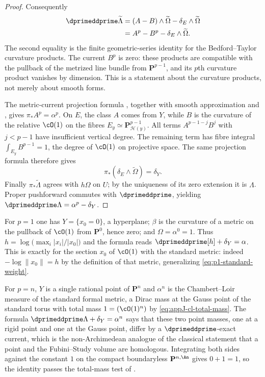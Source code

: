 \begin{proof}
Consequently
\[
 \begin{aligned}
 \dprimeddprime\widetilde\Lambda
  &=(A-B)\wedge\widetilde\Omega
       -\delta_E\wedge\widetilde\Omega\\
  &=A^p-B^p-\delta_E\wedge\widetilde\Omega.
 \end{aligned}
\]
The second equality is the finite geometric-series identity for the
Bedford--Taylor curvature products.  The current $B^p$ is zero: these
products are compatible with the pullback of the metrized line bundle
from $\mathbf P^{p-1}$, and its $p$th curvature product vanishes by
dimension.  This is a statement about the curvature products, not merely
about smooth forms.

The metric-current projection formula
\cite[Theorem~16.5.7]{CLD25}, together with smooth approximation and
, gives
$\pi_*A^p=\alpha^p$.  On $E$, the class $A$ comes from $Y$, while $B$ is the
curvature of the relative $\cO(1)$ on the fibres
$E_y\simeq\mathbf P^{p-1}_{\mathcal H(y)}$.  All terms
$A^{p-1-j}B^j$ with $j<p-1$ have insufficient vertical degree.  The
remaining term has fibre integral
$\int_{E_y}B^{p-1}=1$, the degree of $\cO(1)$ on projective space.
The same projection formula therefore gives
\[
 \pi_*(\delta_E\wedge\widetilde\Omega)=\delta_Y.
\]
Finally $\pi_*\widetilde\Lambda$ agrees with $h\Omega$ on $U$; by the
uniqueness of its zero extension it is $\Lambda$.  Proper pushforward
commutes with $\dprimeddprime$, yielding
$\dprimeddprime\Lambda=\alpha^p-\delta_Y$.
\end{proof}

\begin{example}[$p=1$ recovers Poincar\'e--Lelong again]
\label{ex:ch15-levine-p1}
For $p=1$ one has $Y=\{x_0=0\}$, a hyperplane; $\beta$ is the curvature of a
metric on the pullback of $\cO(1)$ from $\mathbf P^0$, hence zero; and
$\Omega=\alpha^0=1$.  Thus $h=\log\bigl(\max_i|x_i|/|x_0|\bigr)$ and the
formula reads $\dprimeddprime[h]+\delta_Y=\alpha$.  This is exactly
 for the section $x_0$ of $\cO(1)$ with the
standard metric: indeed $-\log\|x_0\|=h$ by the definition of that metric,
generalizing \eqref{eq:p1-standard-weight}.
\end{example}

\begin{example}[$p=n$ and the top power]
\label{ex:ch15-levine-pn}
For $p=n$, $Y$ is a single rational point of $\mathbf P^n$ and $\alpha^n$ is
the Chambert--Loir measure of the standard formal metric, a Dirac mass at the
Gauss point of the standard torus with total mass $1=(\cO(1)^n)$ by
\eqref{eq:appJ-cl-total-mass}.  The formula
$\dprimeddprime\Lambda+\delta_Y=\alpha^n$ says that these two point masses,
one at a rigid point and one at the Gauss point, differ by a
$\dprimeddprime$-exact current, which is the non-Archimedean analogue of the
classical statement that a point and the Fubini--Study volume are homologous.
Integrating both sides against the constant $1$ on the compact boundaryless
$\mathbf P^{n,\An}$ gives $0+1=1$, so the identity passes the total-mass test
of .
\end{example}

